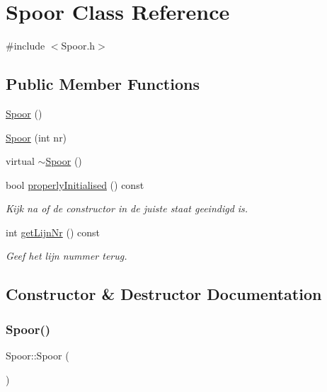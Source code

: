\hypertarget{class_spoor}{}\section{Spoor Class Reference}
\label{class_spoor}


{\ttfamily \#include $<$Spoor.\+h$>$}

\subsection*{Public Member Functions}
\begin{DoxyCompactItemize}
\item 
\hyperlink{class_spoor_a64778a4094d2d9cd3a08cbbef5a11787}{Spoor} ()
\item 
\hyperlink{class_spoor_a6f151487bb74b4ca549a6db47932f8bd}{Spoor} (int nr)
\item 
virtual \hyperlink{class_spoor_a58dcc52a48e4ad3ca7d9028a0065ca98}{$\sim$\+Spoor} ()
\item 
bool \hyperlink{class_spoor_a1eb7c54228676cdb7c8620104e063a3c}{properly\+Initialised} () const
\begin{DoxyCompactList}\small\item\em Kijk na of de constructor in de juiste staat geeindigd is. \end{DoxyCompactList}\item 
int \hyperlink{class_spoor_a66ebc0abcb370b1509bd7b3961a8e45a}{get\+Lijn\+Nr} () const
\begin{DoxyCompactList}\small\item\em Geef het lijn nummer terug. \end{DoxyCompactList}\end{DoxyCompactItemize}


\subsection{Constructor \& Destructor Documentation}
\mbox{\label{class_spoor_a64778a4094d2d9cd3a08cbbef5a11787}} 
\subsubsection{\texorpdfstring{Spoor()}{Spoor()}\hspace{0.1cm}{\footnotesize\ttfamily [1/2]}}
{\footnotesize\ttfamily Spoor\+::\+Spoor (\begin{DoxyParamCaption}{ }\end{DoxyParamCaption})}

